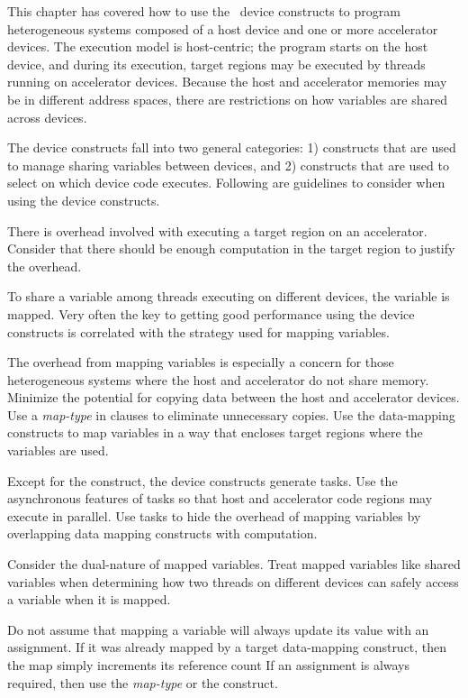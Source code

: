 This chapter has covered how to use the \OMP\ device constructs to
program heterogeneous systems composed of a host device and one or more
accelerator devices.
The execution model is host-centric; the program starts on the host
device, and during its execution, target regions may be executed
by threads running on accelerator devices.
Because the host and accelerator memories may be in different address spaces,  
there are restrictions on how variables are shared across devices.

The device constructs fall into two general categories:  1) constructs
that are used to manage sharing variables between devices, and
2) constructs that are used to select on which device code executes.
Following are guidelines to consider when using the device constructs.

There is overhead involved with executing a target region on an accelerator.  Consider
that there should be enough computation in the target region to justify the
overhead.

To share a variable among threads executing on different devices, the variable
is mapped.
Very often the key to getting good performance using the device constructs is
correlated with the strategy used for mapping variables.  

The overhead from mapping variables is especially a concern for those heterogeneous systems
where the host and accelerator do not share memory.
Minimize the potential for copying data between the host and accelerator devices.
Use a \emph{map-type} in  clauses to eliminate unnecessary copies.
Use the data-mapping constructs to map variables in a way that encloses
target regions where the variables are used.

Except for the  construct, the device constructs generate
tasks.  
Use the asynchronous features of tasks so that 
host and accelerator code regions may execute in parallel.
Use tasks to hide the overhead of mapping
variables by overlapping data mapping constructs with computation.  

Consider the dual-nature of mapped variables.
Treat mapped variables like shared variables when determining how two
threads on different devices can safely access a variable when it is mapped.

Do not assume that mapping a variable will always update its value with an
assignment.  If it was already mapped by a target data-mapping construct, then
the map simply increments its reference count 
If an assignment is always required,
then use the  \emph{map-type} or the  construct.

